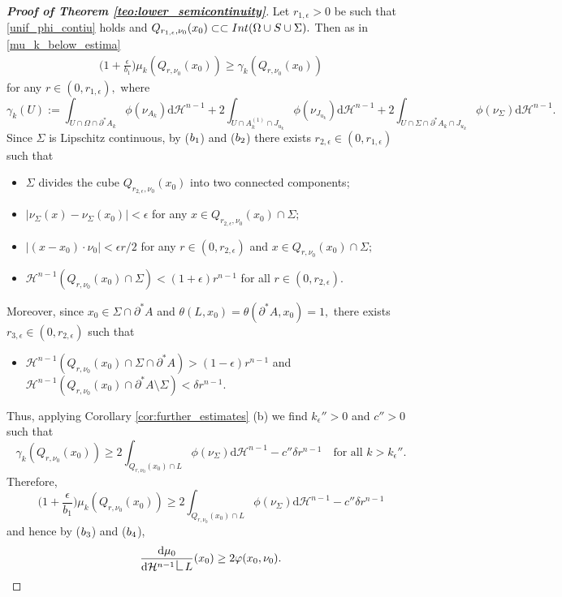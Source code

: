 \documentclass[reqno]{amsart}
\numberwithin{equation}{section}
\theoremstyle{plain}
\theoremstyle{definition}
\newcommand{\cH}{\mathcal{H}}
\newcommand{\p}{\partial}
\newcommand{\bound}{b}
\renewcommand{\d}{\mathrm{d}}
\newcommand{\strictlyincluded}{\subset\subset}
\newcommand{\res}{\mathop{\hbox{\vrule height 9pt width 0.5pt depth 0pt
\vrule height 0.5pt width 5pt depth 0pt}}\nolimits}
\newcommand{\substrate}{S}
\newcommand{\Ins}[1]{{\rm Int}{(#1\cup \substrate\cup \Sigma)}}
\begin{document}
\begin{proof}[\textbf{Proof of Theorem \ref{teo:lower_semicontinuity}}]
Let $r_{1,\epsilon}>0$ be such that \eqref{unif_phi_contiu} holds and $Q_{r_{1,\epsilon},\nu_0}(x_0)\strictlyincluded \Ins{\Omega}.$ Then as in \eqref{mu_k_below_estima}
\begin{align*}
\Big(1+\frac{\epsilon}{\bound_1}\Big)\mu_k(Q_{r,\nu_0}(x_0)) \ge \gamma_k(Q_{r,\nu_0}(x_0)) 
\end{align*}
for any $r\in(0,r_{1,\epsilon}),$ where 
$$
\gamma_k(U):= \int_{U\cap\Omega\cap\p^*A_k} \phi(\nu_{A_k})\d\cH^{n-1} +2\int_{U \cap A_k^{(1)} \cap J_{u_k}} \phi(\nu_{J_{u_k}}) \d\cH^{n-1} + 2 \int_{U\cap\Sigma\cap\p^*A_k\cap J_{u_k}} \phi(\nu_{\Sigma})\d\cH^{n-1}.
$$
Since $\Sigma$ is Lipschitz continuous, by ($\rm b_1$) and ($\rm b_2$) there exists $r_{2,\epsilon}\in(0,r_{1,\epsilon})$ such that 
\begin{itemize}
 \item $\Sigma$ divides the cube $Q_{r_{2,\epsilon},\nu_0}(x_0)$ into two connected components; 
 
 \item  $|\nu_{\Sigma}(x) - \nu_\Sigma(x_0)|<\epsilon$ for any $x\in Q_{r_{2,\epsilon},\nu_0}(x_0)\cap\Sigma;$
 
 \item  $|(x-x_0)\cdot \nu_0| <\epsilon r/2$ for any $r\in (0,r_{2,\epsilon})$ and $x\in Q_{r,\nu_0}(x_0)\cap \Sigma;$ 
 
 \item  $\cH^{n-1}(Q_{r,\nu_0}(x_0)\cap \Sigma) <(1+\epsilon)r^{n-1}$ for all $r\in(0,r_{2,\epsilon}).$
\end{itemize}
Moreover, since $x_0\in \Sigma\cap\p^*A$ and $\theta(L,x_0)=\theta(\p^*A,x_0)=1,$  there exists $r_{3,\epsilon}\in(0,r_{2,\epsilon})$ such that 
%
\begin{itemize}
 \item $\cH^{n-1}(Q_{r,\nu_0}(x_0)\cap\Sigma\cap\p^*A)>(1-\epsilon)r^{n-1}$ and $\cH^{n-1}(Q_{r,\nu_0}(x_0)\cap\p^*A\setminus \Sigma)<\delta r^{n-1}.$ 
\end{itemize}
Thus, applying Corollary \ref{cor:further_estimates} (b) we find $k_\epsilon''>0$ and $c''>0$ such that 
$$
\gamma_k(Q_{r,\nu_0}(x_0)) \ge 2 \int_{Q_{r,\nu_0}(x_0)\cap L} \phi(\nu_\Sigma)\d\cH^{n-1} - c''\delta r^{n-1}\quad \text{for all $k>k_\epsilon''.$}
$$
Therefore,
$$
\Big(1+\frac{\epsilon}{b_1}\Big)\mu_k(Q_{r,\nu_0}(x_0)) \ge 2 \int_{Q_{r,\nu_0}(x_0)\cap L} \phi(\nu_\Sigma)\d\cH^{n-1} - c''\delta r^{n-1} 
$$
and hence  by ($\rm b_3$) and ($\rm b_4$),
$$
 \frac{\d\mu_0}{\d\cH^{n-1}\res L} (x_0) \ge 2\varphi(x_0,\nu_0).
$$



\end{proof}
\end{document}
